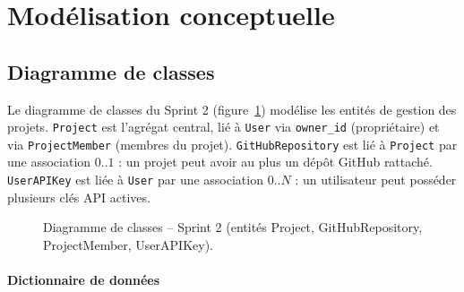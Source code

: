\section{Modélisation conceptuelle}

\subsection{Diagramme de classes}

Le diagramme de classes du Sprint 2 (figure~\ref{fig:sprint2-class}) modélise les entités de gestion des projets. \texttt{Project} est l'agrégat central, lié à \texttt{User} via \texttt{owner\_id} (propriétaire) et via \texttt{ProjectMember} (membres du projet). \texttt{GitHubRepository} est lié à \texttt{Project} par une association \(0..1\) : un projet peut avoir au plus un dépôt GitHub rattaché. \texttt{UserAPIKey} est liée à \texttt{User} par une association \(0..N\) : un utilisateur peut posséder plusieurs clés API actives.

\begin{figure}[H]
\centering
\fbox{\rule{0pt}{2in}\rule{0.9\linewidth}{0pt}}
\caption{Diagramme de classes -- Sprint 2 (entités Project, GitHubRepository, ProjectMember, UserAPIKey).}
\label{fig:sprint2-class}
\end{figure}

\paragraph{Dictionnaire de données}

